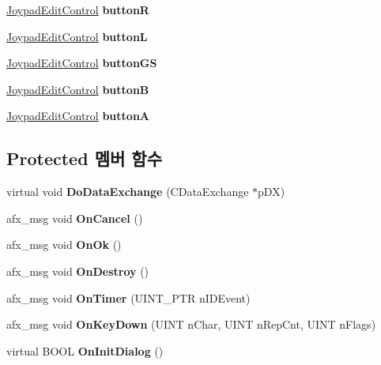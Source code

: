 \begin{DoxyCompactItemize}
\mbox{\hyperlink{class_joypad_edit_control}{Joypad\+Edit\+Control}} {\bfseries buttonR}
\item 
\mbox{\label{class_joypad_config_a5a03e1bd6ea571aeeadfbaee7362830f}} 
\mbox{\hyperlink{class_joypad_edit_control}{Joypad\+Edit\+Control}} {\bfseries buttonL}
\item 
\mbox{\label{class_joypad_config_a4aa48681f17e03adced442271f29211f}} 
\mbox{\hyperlink{class_joypad_edit_control}{Joypad\+Edit\+Control}} {\bfseries button\+GS}
\item 
\mbox{\label{class_joypad_config_a8600f90f1074cda2ff14b73e6fc8e3d6}} 
\mbox{\hyperlink{class_joypad_edit_control}{Joypad\+Edit\+Control}} {\bfseries buttonB}
\item 
\mbox{\label{class_joypad_config_a8b18405a6d92fbdca34cb1d1a6fcee2c}} 
\mbox{\hyperlink{class_joypad_edit_control}{Joypad\+Edit\+Control}} {\bfseries buttonA}
\end{DoxyCompactItemize}
\subsection*{Protected 멤버 함수}
\begin{DoxyCompactItemize}
\item 
\mbox{\label{class_joypad_config_a9b0e5a934f13fb9009211c082933eb50}} 
virtual void {\bfseries Do\+Data\+Exchange} (C\+Data\+Exchange $\ast$p\+DX)
\item 
\mbox{\label{class_joypad_config_a1ff1e82beb3c0cb4363165277fabc796}} 
afx\+\_\+msg void {\bfseries On\+Cancel} ()
\item 
\mbox{\label{class_joypad_config_a80b628b0368a606e47d6ecd2d1e76624}} 
afx\+\_\+msg void {\bfseries On\+Ok} ()
\item 
\mbox{\label{class_joypad_config_a466cce6bccb02ce7a31dd5697668c904}} 
afx\+\_\+msg void {\bfseries On\+Destroy} ()
\item 
\mbox{\label{class_joypad_config_af55cd03e7ed293d17d338858285a8087}} 
afx\+\_\+msg void {\bfseries On\+Timer} (U\+I\+N\+T\+\_\+\+P\+TR n\+I\+D\+Event)
\item 
\mbox{\label{class_joypad_config_a17d863f586b81ee50fa579ec637d834c}} 
afx\+\_\+msg void {\bfseries On\+Key\+Down} (U\+I\+NT n\+Char, U\+I\+NT n\+Rep\+Cnt, U\+I\+NT n\+Flags)
\item 
\mbox{\label{class_joypad_config_afc8d09942cc5d7ff9e69e27a98ff2430}} 
virtual B\+O\+OL {\bfseries On\+Init\+Dialog} ()
\end{DoxyCompactItemize}
